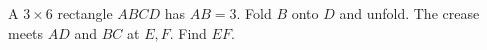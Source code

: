 A $3\times6$ rectangle $ABCD$ has $AB=3$. Fold $B$ onto $D$ and unfold. The crease meets $AD$ and $BC$ at $E,F$. Find $EF$.
